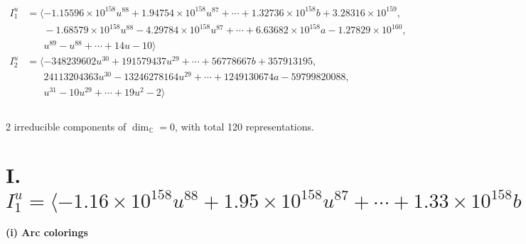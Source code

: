 \documentclass[1p]{elsarticle_modified}
\theoremstyle{definition}
\begin{document}
\begin{align*}
I^u_{1}&=\langle 
-1.15596\times10^{158} u^{88}+1.94754\times10^{158} u^{87}+\cdots+1.32736\times10^{158} b+3.28316\times10^{159},\\
\phantom{I^u_{1}}&\phantom{= \langle  }-1.68579\times10^{158} u^{88}-4.29784\times10^{158} u^{87}+\cdots+6.63682\times10^{158} a-1.27829\times10^{160},\\
\phantom{I^u_{1}}&\phantom{= \langle  }u^{89}- u^{88}+\cdots+14 u-10\rangle \\
I^u_{2}&=\langle 
-348239602 u^{30}+191579437 u^{29}+\cdots+56778667 b+357913195,\\
\phantom{I^u_{2}}&\phantom{= \langle  }24113204363 u^{30}-13246278164 u^{29}+\cdots+1249130674 a-59799820088,\\
\phantom{I^u_{2}}&\phantom{= \langle  }u^{31}-10 u^{29}+\cdots+19 u^2-2\rangle \\
\\
\end{align*}
\raggedright * 2 irreducible components of $\dim_{\mathbb{C}}=0$, with total 120 representations.\\
\newpage
\renewcommand{\arraystretch}{1}
\centering \section*{I. $I^u_{1}= \langle -1.16\times10^{158} u^{88}+1.95\times10^{158} u^{87}+\cdots+1.33\times10^{158} b+3.28\times10^{159},\;-1.69\times10^{158} u^{88}-4.30\times10^{158} u^{87}+\cdots+6.64\times10^{158} a-1.28\times10^{160},\;u^{89}- u^{88}+\cdots+14 u-10 \rangle$}
\flushleft \textbf{(i) Arc colorings}\\
\end{document}
